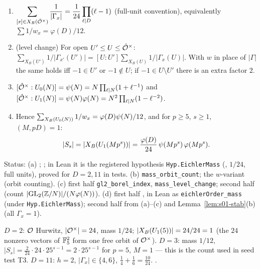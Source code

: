 \begin{theorem}\label{thm:s01-mass}
\begin{enumerate}[label=(\alph*)]
\item $\displaystyle\sum_{[x]\in X_B(\hat{\mathcal{O}}^\times)}\frac1{|\Gamma_x|}=\frac{1}{24}\prod_{\ell\mid D}(\ell-1)$
  (full-unit convention), equivalently $\sum 1/w_x=\varphi(D)/12$.
\item (level change) For open $U'\le U\le\hat{\mathcal{O}}^\times$: $\sum_{X_B(U')}1/|\Gamma_{x'}(U')|=[U:U']\sum_{X_B(U)}1/|\Gamma_x(U)|$.
  With $w$ in place of $|\Gamma|$ the same holds iff $-1\in U'$ or $-1\notin U$; if $-1\in U\setminus U'$ there is an extra
  factor $2$.
\item $[\hat{\mathcal{O}}^\times:U_0(N)]=\psi(N)=N\prod_{\ell\mid N}(1+\ell^{-1})$ and $[\hat{\mathcal{O}}^\times:U_1(N)]=\psi(N)\varphi(N)=N^2\prod_{\ell\mid N}(1-\ell^{-2})$.
\item Hence $\sum_{X_B(U_0(N))}1/w_x=\varphi(D)\psi(N)/12$, and for $p\ge5$, $s\ge1$, $(M,pD)=1$:
\[|S_s|=|X_B(U_1(Mp^s))|=\frac{\varphi(D)}{24}\,\psi(Mp^s)\,\varphi(Mp^s).\]
\end{enumerate}
Status: (a) \stcited{} ; ;
in Lean it is the registered hypothesis \texttt{Hyp.EichlerMass} (, $1/24$, full units), proved
for $D=2,11$ in tests. (b) \stformal{}  \texttt{mass\_orbit\_count}; the $w$-variant \stproved{}
(orbit counting). (c) first half \stformal{} \texttt{gl2\_borel\_index}, \texttt{mass\_level\_change}; second half
\sttoprove{} (count $|\mathrm{GL}_2(\mathbb{Z}/N)|/(N\varphi(N))$). (d) first half \stcited{} , \stpmc{} in Lean as \texttt{eichlerOrder\_mass} (under \texttt{Hyp.EichlerMass}); second half \stpmc{} from (a)--(c)
and Lemma~\ref{lem:s01-stab}(b) (all $\Gamma_x=1$).
\end{theorem}
\begin{example}[checks]\label{ex:s01-masschecks}
$D=2$: $\mathcal{O}$ Hurwitz, $|\mathcal{O}^\times|=24$, mass $1/24$; $|X_B(U_1(5))|=24/24=1$ (the $24$ nonzero vectors of $\mathbb{F}_5^2$
form one free orbit of $\mathcal{O}^\times$). $D=3$: mass $1/12$, $|S_s|=\frac{2}{24}\cdot24\cdot25^{s-1}=2\cdot25^{s-1}$ for
$p=5$, $M=1$ --- this is the count used in seed test T3. $D=11$: $h=2$, $|\Gamma_x|\in\{4,6\}$, $\frac14+\frac16=\frac{10}{24}$.
\stproved.
\end{example}

